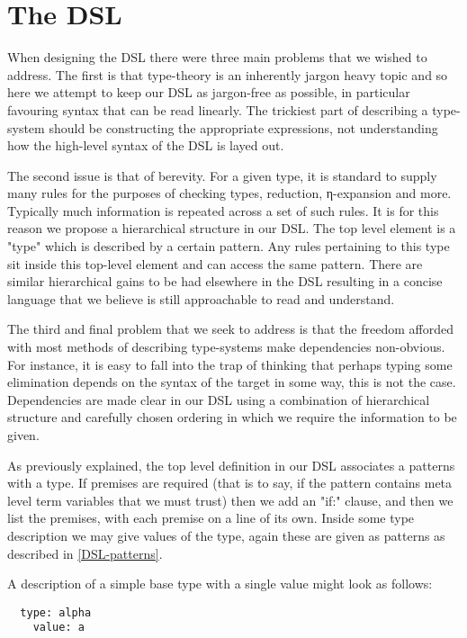\section{The DSL}
\label{DSL}

When designing the DSL there were three main problems that we wished to
address. The first is that
type-theory is an inherently jargon heavy topic and so here we attempt
to keep our DSL as jargon-free as possible, in particular favouring
syntax that can be read linearly. The trickiest part of describing a
type-system should be constructing the appropriate expressions,
not understanding how the high-level syntax of the DSL is layed out.

The second issue is that of berevity. For a given type, it is standard
to supply many rules for the purposes of checking types, reduction,
η-expansion and more. Typically much information is
repeated across a set of such rules. It is for this reason we propose
a hierarchical structure in our DSL. The top level element is a "type"
which is described by a certain pattern. Any rules pertaining to this
type sit inside this top-level element and can access the same
pattern. There are similar hierarchical gains to be had elsewhere in
the DSL resulting in a concise language that we believe is still
approachable to read and understand.

The third and final problem that we seek to address is that the
freedom afforded with most methods of describing type-systems make
dependencies non-obvious. For instance, it is easy to fall into the
trap of thinking that perhaps typing some elimination depends on the
syntax of the target in some way, this is not the case. Dependencies
are made clear in our DSL using a combination of hierarchical
structure and carefully chosen ordering in which we require the
information to be given.

As previously explained, the top level definition in our DSL
associates a patterns with a type. If premises are required (that is
to say, if the pattern contains meta level term variables that we must
trust) then we add an "if:" clause, and then we list the premises,
with each premise on a line of its own. Inside some type description
we may give values of the type, again these are given as patterns as
described in \ref{DSL-patterns}.

A description of a simple base type with a single value might look as
follows:

\begin{BVerbatim}
  type: alpha
    value: a
\end{BVerbatim}

